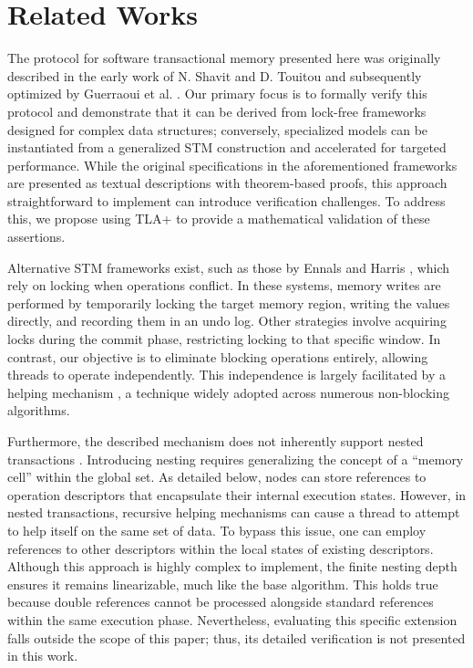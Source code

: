 \section{Related Works}
\label{sec:related_works}

The protocol for software transactional memory presented here was originally described in the early work of N. Shavit and D. Touitou \cite{STM} and subsequently optimized by Guerraoui et al. \cite{EfficientMCAS}. Our primary focus is to formally verify this protocol and demonstrate that it can be derived from lock-free frameworks designed for complex data structures; conversely, specialized models can be instantiated from a generalized STM construction and accelerated for targeted performance. While the original specifications in the aforementioned frameworks are presented as textual descriptions with theorem-based proofs, this approach straightforward to implement can introduce verification challenges. To address this, we propose using TLA+ to provide a mathematical validation of these assertions.

Alternative STM frameworks exist, such as those by Ennals \cite{EnnalsLockBased} and Harris \cite{HarrisJavaSTM}, which rely on locking when operations conflict. In these systems, memory writes are performed by temporarily locking the target memory region, writing the values directly, and recording them in an undo log. Other strategies involve acquiring locks during the commit phase, restricting locking to that specific window. In contrast, our objective is to eliminate blocking operations entirely, allowing threads to operate independently. This independence is largely facilitated by a helping mechanism \cite{WaitFreeSync}, a technique widely adopted across numerous non-blocking algorithms.

Furthermore, the described mechanism does not inherently support nested transactions \cite{ComposableMT}. Introducing nesting requires generalizing the concept of a ``memory cell'' within the global set. As detailed below, nodes can store references to operation descriptors that encapsulate their internal execution states. However, in nested transactions, recursive helping mechanisms can cause a thread to attempt to help itself on the same set of data. To bypass this issue, one can employ references to other descriptors within the local states of existing descriptors. Although this approach is highly complex to implement, the finite nesting depth ensures it remains linearizable, much like the base algorithm. This holds true because double references cannot be processed alongside standard references within the same execution phase. Nevertheless, evaluating this specific extension falls outside the scope of this paper; thus, its detailed verification is not presented in this work.
